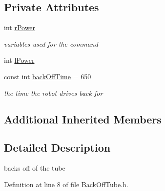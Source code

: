 \subsection*{Private Attributes}
\begin{DoxyCompactItemize}
\item 
int \hyperlink{classBackOffTube_aa03d7c0535e3d7dd4c45a0453ea9f3aa}{r\-Power}
\begin{DoxyCompactList}\small\item\em variables used for the command \end{DoxyCompactList}\item 
int \hyperlink{classBackOffTube_a5eee02bb4a6756ea44206e411211aea8}{l\-Power}
\item 
const int \hyperlink{classBackOffTube_a46fdecac50000c6b1e9ecae3e42ea4b4}{back\-Off\-Time} = 650
\begin{DoxyCompactList}\small\item\em the time the robot drives back for \end{DoxyCompactList}\end{DoxyCompactItemize}
\subsection*{Additional Inherited Members}


\subsection{Detailed Description}
backs off of the tube 

Definition at line 8 of file Back\-Off\-Tube.\-h.



